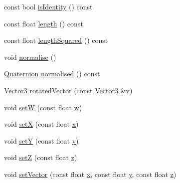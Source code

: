 \begin{DoxyCompactItemize}
\item 
const bool \hyperlink{classprism_1_1geometry_1_1_quaternion_a1e44ba58366ca6ceb78437695ba38d17}{is\+Identity} () const 
\item 
const float \hyperlink{classprism_1_1geometry_1_1_quaternion_a5150e7b2ccdd075359aa53c4b0ddd8c8}{length} () const 
\item 
const float \hyperlink{classprism_1_1geometry_1_1_quaternion_a112cb39325c21f9d2178016af08d0731}{length\+Squared} () const 
\item 
void \hyperlink{classprism_1_1geometry_1_1_quaternion_a31290c70e27365d6b97f72ce8156e43d}{normalise} ()
\item 
\hyperlink{classprism_1_1geometry_1_1_quaternion}{Quaternion} \hyperlink{classprism_1_1geometry_1_1_quaternion_abb08eb769ccd4e41c84810c9265e183d}{normalised} () const 
\item 
\hyperlink{classprism_1_1geometry_1_1_vector3}{Vector3} \hyperlink{classprism_1_1geometry_1_1_quaternion_a263e6e4bb45373b8c040fc6bb86e4df4}{rotated\+Vector} (const \hyperlink{classprism_1_1geometry_1_1_vector3}{Vector3} \&v)
\item 
void \hyperlink{classprism_1_1geometry_1_1_quaternion_a5dd73aef20a6cf30ab612c34e3fc63ed}{setW} (const float \hyperlink{classprism_1_1geometry_1_1_quaternion_a04d1be00d79966209148fc9e0dcd8d29}{w})
\item 
void \hyperlink{classprism_1_1geometry_1_1_quaternion_a6a9812603f54502ef167c4998586507b}{setX} (const float \hyperlink{classprism_1_1geometry_1_1_quaternion_a64b19a3673ae2d7a103ad4edfb70874f}{x})
\item 
void \hyperlink{classprism_1_1geometry_1_1_quaternion_abae324d0c7ecdf5c712ed250c14c0443}{setY} (const float \hyperlink{classprism_1_1geometry_1_1_quaternion_a1eb758ab66dc23e282d8d9c1d891db25}{y})
\item 
void \hyperlink{classprism_1_1geometry_1_1_quaternion_a14a92ab9e9eb9ae065ba888bb1afcb94}{setZ} (const float \hyperlink{classprism_1_1geometry_1_1_quaternion_a0555ec659f2dff30070bfa05c129aa1b}{z})
\item 
void \hyperlink{classprism_1_1geometry_1_1_quaternion_ae65c8cba45afa9c55f4f50b58d1faeb3}{set\+Vector} (const float \hyperlink{classprism_1_1geometry_1_1_quaternion_a64b19a3673ae2d7a103ad4edfb70874f}{x}, const float \hyperlink{classprism_1_1geometry_1_1_quaternion_a1eb758ab66dc23e282d8d9c1d891db25}{y}, const float \hyperlink{classprism_1_1geometry_1_1_quaternion_a0555ec659f2dff30070bfa05c129aa1b}{z})
\item 

\end{DoxyCompactItemize}
